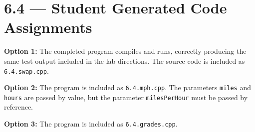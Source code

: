 \documentclass[11pt]{article}
\begin{document}
\section*{6.4 --- Student Generated Code Assignments}

	\textbf{Option 1:} The completed program compiles and runs, correctly producing the same test output included in the lab directions. The source code is included as \texttt{6.4.swap.cpp}.

	\textbf{Option 2:} The program is included as \texttt{6.4.mph.cpp}. The parameters \lstinline{miles} and \lstinline{hours} are passed by value, but the parameter \lstinline{milesPerHour} must be passed by reference.

	\textbf{Option 3:} The program is included as \texttt{6.4.grades.cpp}.
\end{document}
